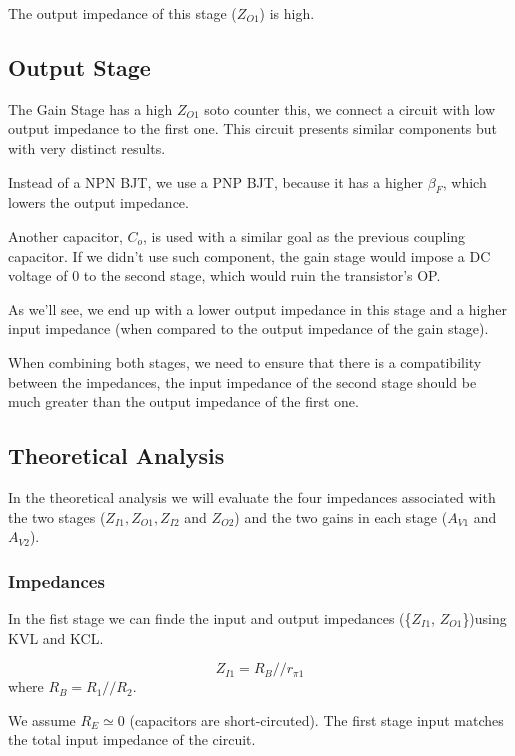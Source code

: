 The output impedance of this stage ($Z_{O1}$) is high.

\subsection{Output Stage}

The Gain Stage has a high $Z_{O1}$ soto counter this, we connect a circuit with low output impedance to the first one. This circuit presents similar components but with very distinct results.

Instead of a NPN BJT, we use a PNP BJT, because it has a higher $\beta_F$, which lowers the output impedance. 

Another capacitor, $C_o$, is used with a similar goal as the previous coupling capacitor. If we didn't use such component, the gain stage would impose a DC voltage of 0 to the second stage, which would ruin the transistor's OP. 

As we'll see, we end up with a lower output impedance in this stage and a higher input impedance (when compared to the output impedance of the gain stage).

When combining both stages, we need to ensure that there is a compatibility  between the impedances, the input impedance of the second stage should be much greater than the output impedance of the first one. 


\clearpage
\subsection{Theoretical Analysis}
\label{subsec:Req}

In the theoretical analysis we will evaluate the four impedances associated with the two stages ($Z_{I1}, Z_{O1}, Z_{I2}$ and $Z_{O2}$) and the two gains in each stage ($A_{V1}$ and $A_{V2}$).

\subsubsection{Impedances}

In the fist stage we can finde the input and output impedances (\{$Z_{I1}$, $Z_{O1}$\})using KVL and KCL.

\begin{equation}
    Z_{I1}=R_B // r_{\pi 1}
\end{equation}
where $R_B=R_1 // R_2$.


We assume $R_E \simeq 0$ (capacitors are short-circuted). 
The first stage input matches the total input impedance of the circuit.

